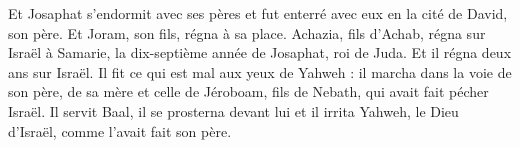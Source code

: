 \begin{multicols}{2}
Et Josaphat s'endormit avec ses pères et fut enterré avec eux en la cité de David, son père. Et Joram, son fils, régna à sa place.
Achazia, fils d'Achab, régna sur Israël à Samarie, la dix-septième année de Josaphat, roi de Juda. Et il régna deux ans sur Israël.
Il fit ce qui est mal aux yeux de Yahweh : il marcha dans la voie de son père, de sa mère et celle de Jéroboam, fils de Nebath, qui avait fait pécher Israël.
Il servit Baal, il se prosterna devant lui et il irrita Yahweh, le Dieu d'Israël, comme l'avait fait son père.
\PPE{}
\end{multicols}
